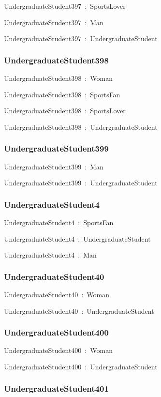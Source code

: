 \documentclass{article}
\begin{document}
UndergraduateStudent397~:~SportsLover

UndergraduateStudent397~:~Man

UndergraduateStudent397~:~UndergraduateStudent

\subsubsection*{UndergraduateStudent398}

UndergraduateStudent398~:~Woman

UndergraduateStudent398~:~SportsFan

UndergraduateStudent398~:~SportsLover

UndergraduateStudent398~:~UndergraduateStudent

\subsubsection*{UndergraduateStudent399}

UndergraduateStudent399~:~Man

UndergraduateStudent399~:~UndergraduateStudent

\subsubsection*{UndergraduateStudent4}

UndergraduateStudent4~:~SportsFan

UndergraduateStudent4~:~UndergraduateStudent

UndergraduateStudent4~:~Man

\subsubsection*{UndergraduateStudent40}

UndergraduateStudent40~:~Woman

UndergraduateStudent40~:~UndergraduateStudent

\subsubsection*{UndergraduateStudent400}

UndergraduateStudent400~:~Woman

UndergraduateStudent400~:~UndergraduateStudent

\subsubsection*{UndergraduateStudent401}
\end{document}

